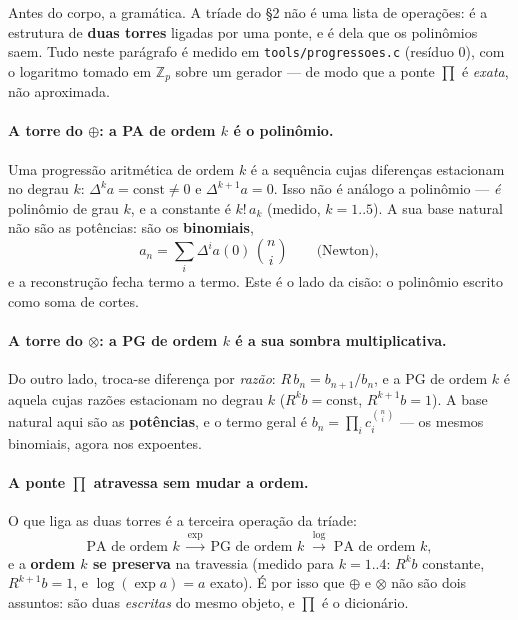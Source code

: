 \documentclass[11pt]{article}
\newcommand{\code}[1]{\texttt{\small #1}}
\newcommand{\Z}{\mathbb Z}
\theoremstyle{plain}
\theoremstyle{remark}
\begin{document}
Antes do corpo, a gramática. A tríade do §2 não é uma lista de operações: é a estrutura de
\textbf{duas torres} ligadas por uma ponte, e é dela que os polinômios saem. Tudo neste parágrafo é
medido em \code{tools/progressoes.c} (resíduo $0$), com o logaritmo tomado em $\Z_p$ sobre um gerador
--- de modo que a ponte $\prod$ é \emph{exata}, não aproximada.

\paragraph{A torre do $\oplus$: a PA de ordem $k$ é o polinômio.} Uma progressão aritmética de ordem
$k$ é a sequência cujas diferenças estacionam no degrau $k$: $\Delta^k a=\text{const}\neq0$ e
$\Delta^{k+1}a=0$. Isso não é análogo a polinômio --- \emph{é} polinômio de grau $k$, e a constante é
$k!\,a_k$ (medido, $k=1..5$). A sua base natural não são as potências: são os \textbf{binomiais},
\[
 a_n=\sum_i \Delta^i a(0)\,\binom{n}{i} \qquad\text{(Newton)},
\]
e a reconstrução fecha termo a termo. Este é o lado da cisão: o polinômio escrito como soma de cortes.

\paragraph{A torre do $\otimes$: a PG de ordem $k$ é a sua sombra multiplicativa.} Do outro lado,
troca-se diferença por \emph{razão}: $R\,b_n=b_{n+1}/b_n$, e a PG de ordem $k$ é aquela cujas razões
estacionam no degrau $k$ ($R^k b=\text{const}$, $R^{k+1}b=1$). A base natural aqui são as
\textbf{potências}, e o termo geral é $b_n=\prod_i c_i^{\binom{n}{i}}$ --- os mesmos binomiais, agora
nos expoentes.

\paragraph{A ponte $\prod$ atravessa sem mudar a ordem.} O que liga as duas torres é a terceira
operação da tríade:
\[
 \text{PA de ordem }k \;\overset{\exp}{\longrightarrow}\; \text{PG de ordem }k
 \;\overset{\log}{\longrightarrow}\; \text{PA de ordem }k,
\]
e a \textbf{ordem $k$ se preserva} na travessia (medido para $k=1..4$: $R^kb$ constante, $R^{k+1}b=1$,
e $\log(\exp a)=a$ exato). É por isso que $\oplus$ e $\otimes$ não são dois assuntos: são duas
\emph{escritas} do mesmo objeto, e $\prod$ é o dicionário.
\end{document}
